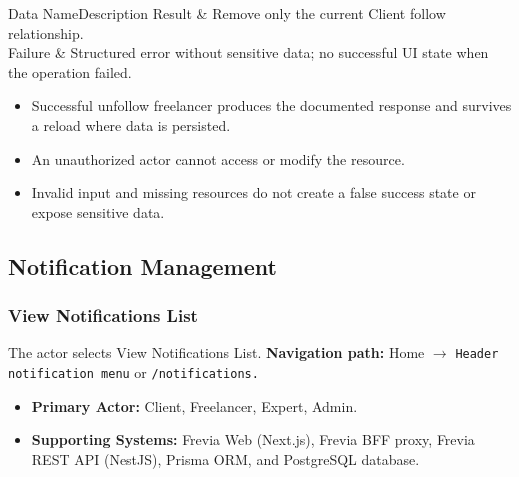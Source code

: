 \begin{specdatatable}{Data Name}{Description}
Result & Remove only the current Client follow relationship.\\ \hline
Failure & Structured error without sensitive data; no successful UI state when the operation failed.\\ \hline
\end{specdatatable}

\begin{itemize}[leftmargin=1.6em,topsep=3pt,itemsep=2pt,parsep=0pt,label=$\bullet$]
    \item Successful unfollow freelancer produces the documented response and survives a reload where data is persisted.
    \item An unauthorized actor cannot access or modify the resource.
    \item Invalid input and missing resources do not create a false success state or expose sensitive data.
\end{itemize}


\subsection{Notification Management}

\subsubsection{View Notifications List}

The actor selects View Notifications List.\newline
\textbf{Navigation path:} Home $\rightarrow$ \texttt{Header notification menu} or \texttt{/\allowbreak{}notifications.}


\begin{itemize}[leftmargin=1.6em,topsep=3pt,itemsep=2pt,parsep=0pt,label=$\bullet$]
    \item \textbf{Primary Actor:} Client, Freelancer, Expert, Admin.
    \item \textbf{Supporting Systems:} Frevia Web (Next.js), Frevia BFF proxy, Frevia REST API (NestJS), Prisma ORM, and PostgreSQL database.
\end{itemize}

